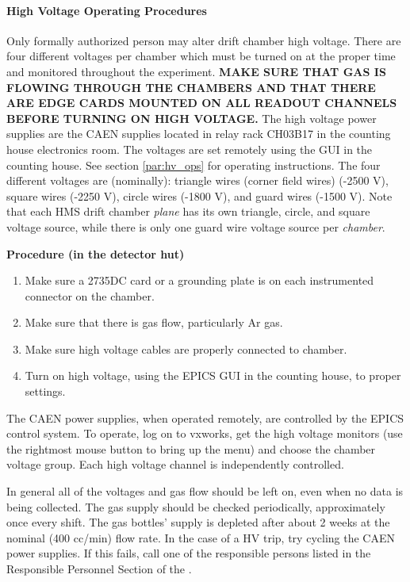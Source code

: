\paragraph{High Voltage Operating Procedures}

Only formally authorized person may alter drift chamber high voltage.
There are four different voltages per chamber which must be turned on at the
proper time and monitored throughout the experiment.  {\bf MAKE SURE THAT
GAS IS FLOWING THROUGH THE CHAMBERS AND THAT THERE ARE 
EDGE 
CARDS MOUNTED
ON ALL READOUT CHANNELS BEFORE TURNING ON HIGH VOLTAGE.}  
The high voltage
power supplies are the CAEN supplies located in relay rack CH03B17 in
the counting house electronics room.  The
voltages are set remotely using the GUI in the counting
house. See section \ref{par:hv_ops} for operating instructions.
The four different voltages are (nominally): triangle
wires (corner field wires) (-2500 V),
square wires (-2250 V), circle wires (-1800 V), and guard wires (-1500 V).
Note that each HMS drift chamber {\em plane} has its own triangle, circle,
and square voltage source, while there is only one guard wire voltage
source per {\em chamber}.
\begin{center}
{\bf Procedure (in the detector hut)}
\end{center}

\begin{enumerate}
\item {Make sure a 2735DC card or a grounding plate is on each instrumented
connector on the chamber.}
\item {Make sure that there is gas flow, particularly Ar gas.}
\item {Make sure high voltage cables are properly connected to
chamber.}
\item {Turn on high voltage, using the EPICS GUI in the counting house, 
to proper settings.}
\end{enumerate}

The CAEN power supplies, when operated remotely, are controlled by the
EPICS control system.  To operate, log on to vxworks, get the high
voltage monitors (use the rightmost mouse button to bring up the menu)
and choose the chamber voltage group.  Each high voltage channel is
independently controlled.

In general all of the voltages and gas flow should be left on, even when
no data is being collected.  The gas supply should be checked periodically,
approximately once every shift.  The gas bottles' supply is depleted
after about 2 weeks at the nominal (400 cc/min) flow rate.
In the case of a HV trip, try cycling the CAEN power supplies.  If this fails, call
one of the responsible persons listed in the Responsible Personnel Section 
of the .




